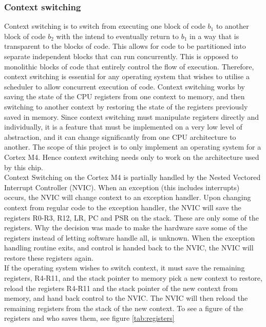 \subsubsection{Context switching}
Context switching is to switch from executing one block of code $b_1$ to another block of code $b_2$
with the intend to eventually return to $b_1$ in a way that is transparent to the blocks of code.
This allows for code to be partitioned into separate independent blocks that can run concurrently.
This is opposed to monolithic blocks of code that entirely control the flow of execution.
Therefore, context switching is essential for any operating system that wishes to utilise a scheduler to allow concurrent execution of code.
Context switching works by saving the state of the CPU registers from one context to memory,
and then switching to another context by restoring the state of the registers previously saved in memory.
Since context switching must manipulate registers directly and individually, it is a feature that must be implemented
on a very low level of abstraction, and it can change significantly from one CPU architecture to another.
The scope of this project is to only implement an operating system for a Cortex M4. Hence context switching needs only
to work on the architecture used by this chip.\\
Context Switching on the Cortex M4 is partially handled by the Nested Vectored Interrupt Controller (NVIC).
When an exception (this includes interrupts) occurs, the NVIC will change context to an exception handler.
Upon changing context from regular code to the exception handler, the NVIC will save the registers R0-R3, R12, LR, PC and PSR
on the stack. These are only some of the registers. Why the decision was made to make the hardware save some of the
registers instead of letting software handle all, is unknown. 
When the exception handling routine exits, and control is handed back to the NVIC,
the NVIC will restore these registers again.\\
If the operating system wishes to switch context, it must save the remaining registers, R4-R11, and the stack pointer to memory
pick a new context to restore, reload the registers R4-R11 and the stack pointer of the new context from memory,
and hand back control to the NVIC. The NVIC will then reload the remaining registers from the stack of the new context. To see a figure of the registers and who saves them, see figure \ref{tab:registers}\\\\


